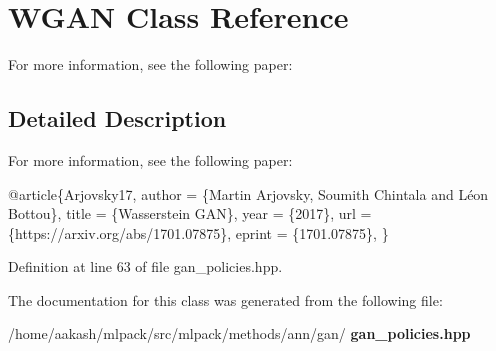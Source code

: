 \section{W\+G\+AN Class Reference}
\label{classmlpack_1_1ann_1_1WGAN}


For more information, see the following paper\+:  




\subsection{Detailed Description}
For more information, see the following paper\+: 


\begin{DoxyCode}
@article\{Arjovsky17,
  author    = \{Martin Arjovsky, Soumith Chintala and Léon Bottou\},
  title     = \{Wasserstein GAN\},
  year      = \{2017\},
  url       = \{https:\textcolor{comment}{//arxiv.org/abs/1701.07875\},}
  eprint    = \{1701.07875\},
\}
\end{DoxyCode}
 

Definition at line 63 of file gan\+\_\+policies.\+hpp.



The documentation for this class was generated from the following file\+:\begin{DoxyCompactItemize}
\item 
/home/aakash/mlpack/src/mlpack/methods/ann/gan/\textbf{ gan\+\_\+policies.\+hpp}\end{DoxyCompactItemize}
